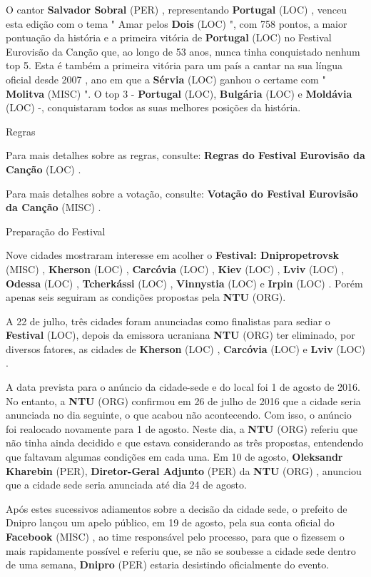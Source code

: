 \documentclass[12pt,a4paper]{article}
\begin{document}
O cantor \textbf{Salvador Sobral} (PER) , representando \textbf{Portugal} (LOC) , venceu esta edição com o tema " Amar pelos \textbf{Dois} (LOC) ", com 758 pontos, a maior pontuação da história e a primeira vitória de \textbf{Portugal} (LOC) no Festival Eurovisão da Canção que, ao longo de 53 anos, nunca tinha conquistado nenhum top 5. Esta é também a primeira vitória para um país a cantar na sua língua oficial desde 2007 , ano em que a \textbf{Sérvia} (LOC) ganhou o certame com " \textbf{Molitva} (MISC) ". O top 3 - \textbf{Portugal} (LOC), \textbf{Bulgária} (LOC) e \textbf{Moldávia} (LOC) -, conquistaram todos as suas melhores posições da história.



Regras

Para mais detalhes sobre as regras, consulte: \textbf{Regras do Festival Eurovisão da Canção} (LOC) .

Para mais detalhes sobre a votação, consulte: \textbf{Votação do Festival Eurovisão da Canção} (MISC) .



Preparação do Festival

Nove cidades mostraram interesse em acolher o \textbf{Festival: Dnipropetrovsk} (MISC) , \textbf{Kherson} (LOC) , \textbf{Carcóvia} (LOC) , \textbf{Kiev} (LOC) , \textbf{Lviv} (LOC) , \textbf{Odessa} (LOC) , \textbf{Tcherkássi} (LOC) , \textbf{Vinnystia} (LOC) e \textbf{Irpin} (LOC) . Porém apenas seis seguiram as condições propostas pela \textbf{NTU} (ORG).

A 22 de julho, três cidades foram anunciadas como finalistas para sediar o \textbf{Festival} (LOC), depois da emissora ucraniana \textbf{NTU} (ORG) ter eliminado, por diversos fatores, as cidades de \textbf{Kherson} (LOC) , \textbf{Carcóvia} (LOC) e \textbf{Lviv} (LOC) .

A data prevista para o anúncio da cidade-sede e do local foi 1 de agosto de 2016. No entanto, a \textbf{NTU} (ORG) confirmou em 26 de julho de 2016 que a cidade seria anunciada no dia seguinte, o que acabou não acontecendo. Com isso, o anúncio foi realocado novamente para 1 de agosto. Neste dia, a \textbf{NTU} (ORG) referiu que não tinha ainda decidido e que estava considerando as três propostas, entendendo que faltavam algumas condições em cada uma. Em 10 de agosto, \textbf{Oleksandr Kharebin} (PER), \textbf{Diretor-Geral Adjunto} (PER) da \textbf{NTU} (ORG) , anunciou que a cidade sede seria anunciada até dia 24 de agosto.

Após estes sucessivos adiamentos sobre a decisão da cidade sede, o prefeito de Dnipro lançou um apelo público, em 19 de agosto, pela sua conta oficial do \textbf{Facebook} (MISC) , ao time responsável pelo processo, para que o fizessem o mais rapidamente possível e referiu que, se não se soubesse a cidade sede dentro de uma semana, \textbf{Dnipro} (PER) estaria desistindo oficialmente do evento.
\end{document}
